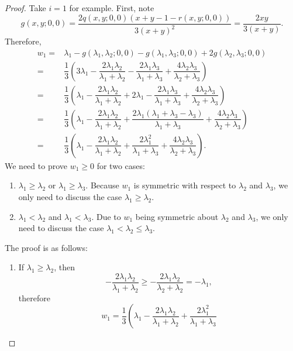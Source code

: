 \begin{proof}
  Take $i = 1$ for example. First, note
  \[
    g(x,y; 0,0) = \dfrac{2 q(x,y; 0,0)(x + y -1 -r(x,y;0,0))}{3(x+y)^2} 
    = \dfrac{2 xy}{3(x+y)}.
  \]
  Therefore,
  \[
    \begin{split}
      w_1 =    & \lambda_1 - g(\lambda_1,\lambda_2;0,0) -g(\lambda_1, \lambda_3;0,0)
      + 2 g(\lambda_2,\lambda_3;0,0) \\
      = & \dfrac13\left(3\lambda_1 - \dfrac{2\lambda_1 \lambda_2}
      {\lambda_1 + \lambda_2} - \dfrac{2\lambda_1 \lambda_3}
      {\lambda_1 + \lambda_3} + \dfrac{4 \lambda_2 \lambda_3}
    {\lambda_2 + \lambda_3} \right) \\
    = & \dfrac13\left(\lambda_1 - \dfrac{2\lambda_1 \lambda_2}
    {\lambda_1 + \lambda_2} + 2 \lambda_1 - \dfrac{2 \lambda_1 \lambda_3}
    {\lambda_1 + \lambda_3}
  + \dfrac{4 \lambda_2 \lambda_3}{\lambda_2 + \lambda_3}\right) \\
  = & \dfrac13\left(\lambda_1 - \dfrac{2\lambda_1 \lambda_2}
  {\lambda_1 + \lambda_2} + \dfrac{2 \lambda_1(\lambda_1 + \lambda_3 - \lambda_3)}
  {\lambda_1 + \lambda_3}
+ \dfrac{4 \lambda_2 \lambda_3}{\lambda_2 + \lambda_3}\right) \\
= & \dfrac13\left(\lambda_1 - \dfrac{2\lambda_1 \lambda_2}
{\lambda_1 + \lambda_2} + \dfrac{2 \lambda_1^2}{\lambda_1 + \lambda_3}
    + \dfrac{4 \lambda_2 \lambda_3}{\lambda_2 + \lambda_3}\right). 
  \end{split}
\]
We need to prove $w_1 \geq 0$ for two cases: 
  \begin{enumerate}
  \item $\lambda_1 \geq \lambda_2$ or $\lambda_1 \geq \lambda_3$.
    Because $w_1$ is symmetric with respect to $\lambda_2$ and
    $\lambda_3$, we only need to discuss the case 
    $\lambda_1 \geq \lambda_2$.
  \item $\lambda_1 < \lambda_2$ and $\lambda_1 < \lambda_3$.
    Due to $w_1$ being symmetric about $\lambda_2$ and $\lambda_3$,
    we only need to discuss the case $\lambda_1 < \lambda_2 \leq
    \lambda_3$.
  \end{enumerate}
  The proof is as follows:
  \begin{enumerate}
  \item If $\lambda_1 \geq \lambda_2$, then
    \[
    -\dfrac{2\lambda_1 \lambda_2}{\lambda_1 + \lambda_2}
    \geq -\dfrac{2\lambda_1 \lambda_2}{\lambda_2 + \lambda_2}
    = -\lambda_1,
    \]
    therefore
    \[
    w_1 = \dfrac13\left(\lambda_1 - \dfrac{2\lambda_1 \lambda_2}
      {\lambda_1 + \lambda_2} + \dfrac{2 \lambda_1^2}{\lambda_1 + \lambda_3}
\]
\end{enumerate}
\end{proof}
